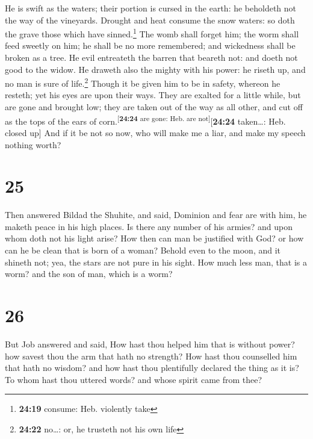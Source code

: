  He is swift as the waters; their portion is cursed in
the earth: he beholdeth not the way of the vineyards. 
Drought and heat consume the snow waters: so doth the grave those which
have sinned.\footnote{\textbf{24:19} consume: Heb. violently take}
 The womb shall forget him; the worm shall feed sweetly
on him; he shall be no more remembered; and wickedness shall be broken
as a tree.  He evil entreateth the barren that beareth
not: and doeth not good to the widow.  He draweth also
the mighty with his power: he riseth up, and no man is sure of
life.\footnote{\textbf{24:22} no\ldots: or, he trusteth not his own life}
 Though it be given him to be in safety, whereon he
resteth; yet his eyes are upon their ways.  They are
exalted for a little while, but are gone and brought low; they are taken
out of the way as all other, and cut off as the tops of the ears of
corn.\textsuperscript{{[}\textbf{24:24} are gone: Heb. are
not{]}}{[}\textbf{24:24} taken\ldots: Heb. closed up{]} 
And if it be not so now, who will make me a liar, and make my speech
nothing worth?

\hypertarget{section-24}{%
\section{25}\label{section-24}}

 Then answered Bildad the Shuhite, and said,
 Dominion and fear are with him, he maketh peace in his
high places.  Is there any number of his armies? and upon
whom doth not his light arise?  How then can man be
justified with God? or how can he be clean that is born of a woman?
 Behold even to the moon, and it shineth not; yea, the
stars are not pure in his sight.  How much less man, that
is a worm? and the son of man, which is a worm?

\hypertarget{section-25}{%
\section{26}\label{section-25}}

 But Job answered and said,  How hast thou
helped him that is without power? how savest thou the arm that hath no
strength?  How hast thou counselled him that hath no
wisdom? and how hast thou plentifully declared the thing as it is?
 To whom hast thou uttered words? and whose spirit came
from thee?

